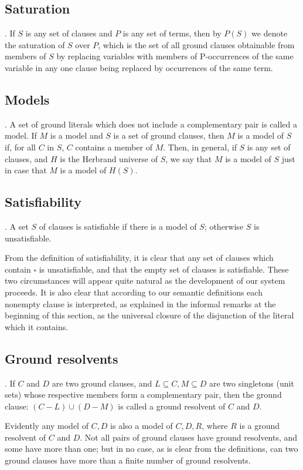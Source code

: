 \documentclass[8pt]{extarticle}
\begin{document}
\subsection{Saturation}. If $S$ is any set of clauses and $P$ is any set of terms, then by $P(S)$ we denote the saturation of $S$ over $P$, which is the set of all ground clauses obtainable from members of $S$ by replacing variables with members of P-occurrences of the same variable in any one clause being replaced by occurrences of the same term.

\subsection{Models}. A set of ground literals which does not include a complementary pair is called a model. If $M$ is a model and $S$ is a set of ground clauses, then $M$ is a model of $S$ if, for all $C$ in $S$, $C$ contains a member of $M$. Then, in general, if $S$ is any set of clauses, and $H$ is the Herbrand universe of $S$, we say that $M$ is a model of $S$ just in case that $M$ is a model of $H(S)$.

\subsection{Satisfiability}. A set $S$ of clauses is satisfiable if there is a model of $S$; otherwise $S$ is unsatisfiable.

From the definition of satisfiability, it is clear that any set of clauses which contain $\square$ is unsatisfiable, and that the empty set of clauses is satisfiable. These two circumstances will appear quite natural as the development of our system proceeds. It is also clear that according to our semantic definitions each nonempty clause is interpreted, as explained in the informal remarks at the beginning of this section, as the universal closure of the disjunction of the literal which it contains.

\subsection{Ground resolvents}. If $C$ and $D$ are two ground clauses, and $L\subseteq C,M\subseteq D$ are two singletons (unit sets) whose respective members form a complementary pair, then the ground clause: $(C - L)\cup (D - M)$ is called a ground resolvent of $C$ and $D$.

Evidently any model of ${C,D}$ is also a model of ${C,D,R}$, where $R$ is a ground resolvent of $C$ and $D$. Not all pairs of ground clauses have ground resolvents, and some have more than one; but in no case, as is clear from the definitions, can two ground clauses have more than a finite number of ground resolvents.
\end{document}
